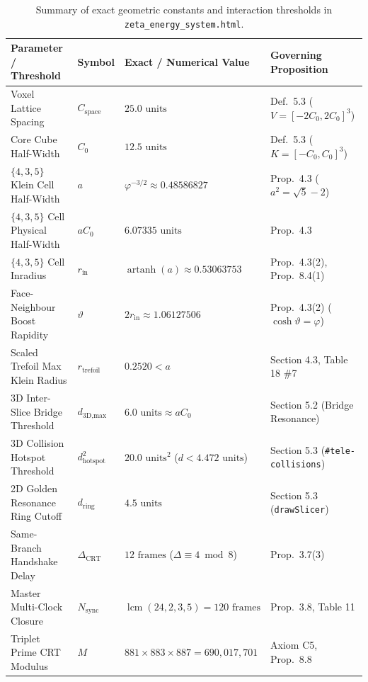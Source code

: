\documentclass[11pt, a4paper]{article}
\begin{document}
\begin{table}[htbp]
\centering
\caption{Summary of exact geometric constants and interaction thresholds in \texttt{zeta\_energy\_system.html}.}
\label{tab:thresholds}
\begin{tabular}{@{}llll@{}}
\toprule
\textbf{Parameter / Threshold} & \textbf{Symbol} & \textbf{Exact / Numerical Value} & \textbf{Governing Proposition} \\
\midrule
Voxel Lattice Spacing & $C_{\text{space}}$ & $25.0\text{ units}$ & Def.~5.3 ($V = [-2C_0, 2C_0]^3$) \\
Core Cube Half-Width & $C_0$ & $12.5\text{ units}$ & Def.~5.3 ($K = [-C_0, C_0]^3$) \\
$\{4,3,5\}$ Klein Cell Half-Width & $a$ & $\varphi^{-3/2} \approx 0.48586827$ & Prop.~4.3 ($a^2 = \sqrt{5}-2$) \\
$\{4,3,5\}$ Cell Physical Half-Width & $a C_0$ & $6.07335\text{ units}$ & Prop.~4.3 \\
$\{4,3,5\}$ Cell Inradius & $r_{\text{in}}$ & $\operatorname{artanh}(a) \approx 0.53063753$ & Prop.~4.3(2), Prop.~8.4(1) \\
Face-Neighbour Boost Rapidity & $\vartheta$ & $2r_{\text{in}} \approx 1.06127506$ & Prop.~4.3(2) ($\cosh\vartheta = \varphi$) \\
Scaled Trefoil Max Klein Radius & $r_{\text{trefoil}}$ & $0.2520 < a$ & Section 4.3, Table 18 \#7 \\
3D Inter-Slice Bridge Threshold & $d_{\text{3D,max}}$ & $6.0\text{ units} \approx a C_0$ & Section 5.2 (Bridge Resonance) \\
3D Collision Hotspot Threshold & $d_{\text{hotspot}}^2$ & $20.0\text{ units}^2$ ($d < 4.472\text{ units}$) & Section 5.3 (\texttt{\#tele-collisions}) \\
2D Golden Resonance Ring Cutoff & $d_{\text{ring}}$ & $4.5\text{ units}$ & Section 5.3 (\texttt{drawSlicer}) \\
Same-Branch Handshake Delay & $\Delta_{\text{CRT}}$ & $12\text{ frames}$ ($\Delta \equiv 4 \bmod 8$) & Prop.~3.7(3) \\
Master Multi-Clock Closure & $N_{\text{sync}}$ & $\operatorname{lcm}(24,2,3,5) = 120\text{ frames}$ & Prop.~3.8, Table 11 \\
Triplet Prime CRT Modulus & $M$ & $881 \times 883 \times 887 = 690,017,701$ & Axiom C5, Prop.~8.8 \\
\bottomrule
\end{tabular}
\end{table}
\end{document}
